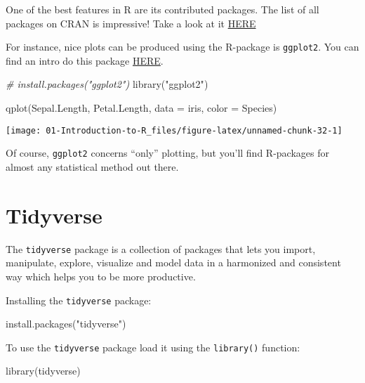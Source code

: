 \documentclass[
]{book}
\newenvironment{Shaded}{\begin{snugshade}}{\end{snugshade}}
\newcommand{\AttributeTok}[1]{\textcolor[rgb]{0.77,0.63,0.00}{#1}}
\newcommand{\CommentTok}[1]{\textcolor[rgb]{0.56,0.35,0.01}{\textit{#1}}}
\newcommand{\FunctionTok}[1]{\textcolor[rgb]{0.00,0.00,0.00}{#1}}
\newcommand{\NormalTok}[1]{#1}
\newcommand{\StringTok}[1]{\textcolor[rgb]{0.31,0.60,0.02}{#1}}
\begin{document}
One of the best features in R are its contributed packages. The list of all packages on CRAN is impressive! Take a look at it \href{https://cran.r-project.org/web/packages/available_packages_by_name.html}{HERE}

For instance, nice plots can be produced using the R-package is \texttt{ggplot2}. You can find an intro do this package \href{http://ggplot2.tidyverse.org/}{HERE}.

\begin{Shaded}
\begin{Highlighting}[]
\CommentTok{\# install.packages("ggplot2")}
\FunctionTok{library}\NormalTok{(}\StringTok{"ggplot2"}\NormalTok{)}

\FunctionTok{qplot}\NormalTok{(Sepal.Length, Petal.Length, }\AttributeTok{data =}\NormalTok{ iris, }\AttributeTok{color =}\NormalTok{ Species)}
\end{Highlighting}
\end{Shaded}

\begin{center}\texttt{[image: 01-Introduction-to-R\_files/figure-latex/unnamed-chunk-32-1]} \end{center}

\hfill\break

Of course, \texttt{ggplot2} concerns ``only'' plotting, but you'll find R-packages for almost any statistical method out there.

\hypertarget{tidyverse}{%
\section{Tidyverse}\label{tidyverse}}

The \texttt{tidyverse} package is a collection of packages that lets you import,
manipulate, explore, visualize and model data in a harmonized and consistent way which
helps you to be more productive.

Installing the \texttt{tidyverse} package:

\begin{Shaded}
\begin{Highlighting}[]
\FunctionTok{install.packages}\NormalTok{(}\StringTok{"tidyverse"}\NormalTok{)}
\end{Highlighting}
\end{Shaded}

To use the \texttt{tidyverse} package load it using the \texttt{library()} function:

\begin{Shaded}
\begin{Highlighting}[]
\FunctionTok{library}\NormalTok{(tidyverse)}
\end{Highlighting}
\end{Shaded}
\end{document}

